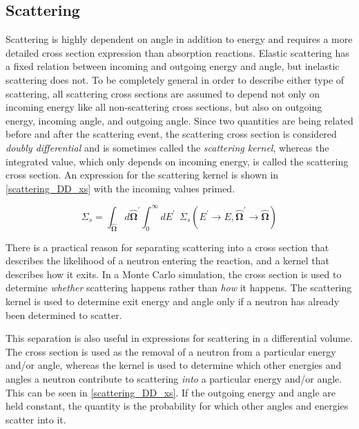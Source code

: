 \subsection{Scattering}

Scattering is highly dependent on angle in addition to energy and requires a more detailed cross section expression than absorption reactions.  Elastic scattering has a fixed relation between incoming and outgoing energy and angle, but inelastic scattering does not. To be completely general in order to describe either type of scattering, all scattering cross sections are assumed to depend not only on incoming energy like all non-scattering cross sections, but also on outgoing energy, incoming angle, and outgoing angle.  Since two quantities are being related before and after the scattering event, the scattering cross section is considered \emph{doubly differential} and is sometimes called the \emph{scattering kernel}, whereas the integrated value, which only depends on incoming energy, is called the scattering cross section.   An expression for the scattering kernel is shown in \eqref{scattering_DD_xs} with the incoming values primed.

\begin{equation}
\label{scattering_DD_xs}
\Sigma_s = \int_{\boldsymbol{\hat{\Omega}}} d\boldsymbol{\hat{\Omega}}^\prime \int_0^\infty dE^\prime \: \: \Sigma_s(E^\prime \rightarrow E,\boldsymbol{\hat{\Omega}}^\prime \rightarrow \boldsymbol{\hat{\Omega}})
 \end{equation}

There is a practical reason for separating scattering into a cross
 section that describes the likelihood of a neutron entering the reaction, and a kernel that describes how it exits.  In a Monte Carlo simulation, the cross section is used to determine \emph{whether} scattering happens rather than \emph{how} it happens.  The scattering kernel is used to determine exit energy and angle only if a neutron has already been determined to scatter.  
 
This separation is also useful in expressions for scattering in a differential volume.  The cross section is used as the removal of a neutron from a particular energy and/or angle, whereas the kernel is used to determine which other energies and angles a neutron contribute to scattering \emph{into} a particular energy and/or angle.  This can be seen in \eqref{scattering_DD_xs}.  If the outgoing energy and angle are held constant, the quantity is the probability for which other angles and energies scatter into it.

